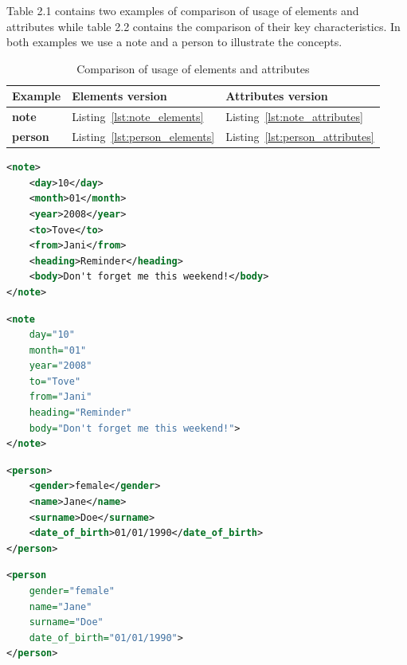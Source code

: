 \documentclass{scrbook}
\begin{document}
Table 2.1 contains two examples of comparison of usage of elements and attributes while table 2.2 contains the comparison of their key characteristics. In both examples we use a note and a person to illustrate the concepts.

\begin{table}[h!]
    \centering
    \begin{tabularx}{\textwidth}{|X|X|X|}
        \hline
        \textbf{Example} & \textbf{Elements version} & \textbf{Attributes version} \\
        \hline

        \textbf{note} & Listing~\ref{lst:note_elements} & Listing~\ref{lst:note_attributes} \\
        \hline

        \textbf{person} & Listing~\ref{lst:person_elements} & Listing~\ref{lst:person_attributes} \\
        \hline
    \end{tabularx}
    \caption{Comparison of usage of elements and attributes}
\end{table}

\begin{lstlisting}[language=XML, caption={note with elements}, label={lst:note_elements}]
<note>
    <day>10</day>
    <month>01</month>
    <year>2008</year>
    <to>Tove</to>
    <from>Jani</from>
    <heading>Reminder</heading>
    <body>Don't forget me this weekend!</body>
</note>
\end{lstlisting}

\begin{lstlisting}[language=XML, caption={note with attributes}, label={lst:note_attributes}]
<note
    day="10"
    month="01"
    year="2008"
    to="Tove"
    from="Jani"
    heading="Reminder"
    body="Don't forget me this weekend!">
</note>
\end{lstlisting}

\begin{lstlisting}[language=XML, caption={person with elements}, label={lst:person_elements}]
<person>
    <gender>female</gender>
    <name>Jane</name>
    <surname>Doe</surname>
    <date_of_birth>01/01/1990</date_of_birth>
</person>
\end{lstlisting}

\begin{lstlisting}[language=XML, caption={person with attributes}, label={lst:person_attributes}]
<person
    gender="female"
    name="Jane"
    surname="Doe"
    date_of_birth="01/01/1990">
</person>
\end{lstlisting}
\end{document}
